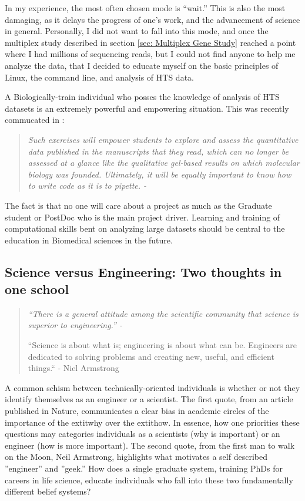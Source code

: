     In my experience, the most often chosen mode is ``wait.'' This is also the most damaging, as it delays the progress of one's work, and the advancement of science in general. Personally, I did not want to fall into this mode, and once the multiplex study described in section \ref{sec: Multiplex Gene Study} reached a point where I had millions of sequencing reads, but I could not find anyone to help me analyze the data, that I decided to educate myself on the basic principles of Linux, the command line, and analysis of HTS data.

    A Biologically-train individual who posses the knowledge of analysis of HTS datasets is an extremely powerful and empowering situation. This was recently commucated in \citet{Plocik2013}:

    \begin{quote} %
      \itshape 
      Such exercises will empower students to explore and assess the quantitative data published in the manuscripts that they read, which can no longer be assessed at a glance like the qualitative gel-based results on which molecular biology was founded. Ultimately, it will be equally important to know how to write code as it is to pipette. - \citep{Plocik2013}
      \singlespacing
      \end{quote}

    The fact is that no one will care about a project as much as the Graduate student or PostDoc who is the main project driver. Learning and training of computational skills bent on analyzing large datasets should be central to the education in Biomedical sciences in the future.

  \subsection{Science versus Engineering: Two thoughts in one school}

    \begin{quote}
      \itshape 
      \singlespacing
        “There is a general attitude among the scientific community that science is superior to engineering.” - \citep{Macilwain2010}

      “Science is about what is; engineering is about what can be. Engineers are dedicated to solving problems and creating new, useful, and efficient things.“ - Niel Armstrong
      \end{quote}

    A common schism between technically-oriented individuals is whether or not they identify themselves as an engineer or a scientist. The first quote, from an article published in Nature, communicates a clear bias in academic circles of the importance of the   extit{why} over the   extit{how}. In essence, how one priorities these questions may categories individuals as a scientists (why is important) or an engineer (how is more important). The second quote, from the first man to walk on the Moon, Neil Armstrong, highlights what motivates a self described ”engineer” and ”geek.” How does a single graduate system, training PhDs for careers in life science, educate individuals who fall into these two fundamentally different belief systems?

